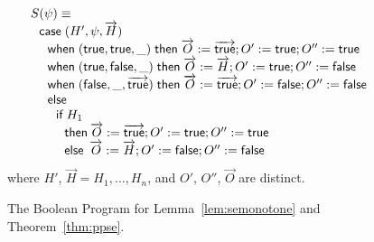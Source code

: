 \documentclass{llncs}
\newcommand{\vect}[1]{\overrightarrow{{#1}}}
\begin{document}
\begin{figure}[t]
\[
\begin{array}{l}
S(\psi)\equiv\\
\ \ {\sf case}\;(H',\psi,\vect{H})\\
\ \ \ \ {\sf when}\;({\sf true},{\sf true},\_)\;{\sf then}\;\vect{O}:=\vect{\sf true};O':={\sf true};O'':={\sf true} \\
\ \ \ \ {\sf when}\;({\sf true},{\sf false},\_)\;{\sf then}\;\vect{O}:={\vect H};O':={\sf true};O'':={\sf false}\\
\ \ \ \ {\sf when}\;({\sf false},\_,\vect{\sf true})\;{\sf then}\;{\vect O}:=\vect{\sf true};O':={\sf false};O'':={\sf false}\\
\ \ \ \ {\sf else}\\
\ \ \ \ \ \ {\sf if}\:H_1\\
\ \ \ \ \ \ \ \ {\sf then}\:\vect{O}:=\vect{\sf true};O':={\sf true};O'':={\sf true}\\
\ \ \ \ \ \ \ \ {\sf else}\hspace{5pt}{\vect{O}:={\vect H};O':={\sf false};O'':={\sf false}}
\end{array}
\]
where $H'$, $\vect{H}= H_1, \dots, H_n$, and $O'$, $O''$, $\vec{O}$ are distinct.
\caption{The Boolean Program for Lemma~\ref{lem:semonotone} and Theorem~\ref{thm:ppse}.}
\label{fig:boolenc}
\end{figure}
\end{document}
